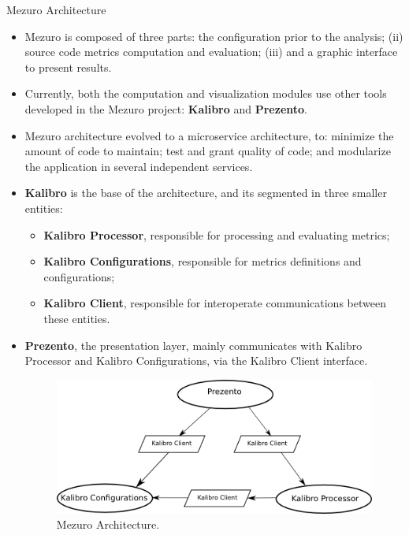 \begin{block}{Mezuro Architecture}
    \begin{itemize}
        \item Mezuro is composed of three parts: the configuration prior to
            the analysis; (ii) source code metrics computation and evaluation;
            (iii) and a graphic interface to present results.

        \item Currently, both the computation and visualization modules use
            other tools developed in the Mezuro project: \textbf{Kalibro} and
            \textbf{Prezento}.

        \item Mezuro architecture evolved to a microservice architecture, to:
            minimize the amount of code to maintain; test and grant quality of
            code; and modularize the application in several independent services.

        \item \textbf{Kalibro} is the base of the architecture, and its
            segmented in three smaller entities:

            \begin{itemize}
                \item \textbf{Kalibro Processor}, responsible for processing and
                    evaluating metrics;
                \item \textbf{Kalibro Configurations}, responsible for metrics
                    definitions and configurations;
                \item \textbf{Kalibro Client}, responsible for interoperate
                    communications between these entities.
            \end{itemize}

        \item \textbf{Prezento}, the presentation layer, mainly communicates with
            Kalibro Processor and Kalibro Configurations, via the Kalibro
            Client interface.
        \begin{figure}
            \begin{center}
                \includegraphics[scale=1.5]{figures/MezuroArchitecture.png}
                \caption{Mezuro Architecture.}
                \label{fig:architecture}
            \end{center}
        \end{figure}
    \end{itemize}
\end{block}
